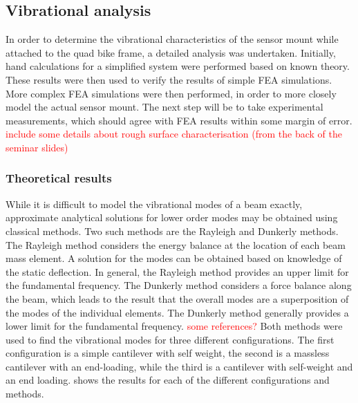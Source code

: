 \documentclass[main.tex]{subfiles}
\begin{document}
\subsection{Vibrational analysis}
In order to determine the vibrational characteristics of the sensor mount while attached to the quad bike frame, a detailed analysis was undertaken. Initially, hand calculations for a simplified system were performed based on known theory. These results were then used to verify the results of simple FEA simulations. More complex FEA simulations were then performed, in order to more closely model the actual sensor mount. The next step will be to take experimental measurements, which should agree with FEA results within some margin of error. 
 \textcolor{red}{include some details about rough surface characterisation (from the back of the seminar slides) }
\subsubsection{Theoretical results}
While it is difficult to model the vibrational modes of a beam exactly, approximate analytical solutions for lower order modes may be obtained using classical methods. Two such methods are the Rayleigh and Dunkerly methods. The Rayleigh method considers the energy balance at the location of each beam mass element. A solution for the modes can be obtained based on knowledge of the static deflection. In general, the Rayleigh method provides an upper limit for the fundamental frequency. The Dunkerly method considers a force balance along the beam, which leads to the result that the overall modes are a superposition of the modes of the individual elements. The Dunkerly method generally provides a lower limit for the fundamental frequency.
\textcolor{red}{some references?}
Both methods were used to find the vibrational modes for three different configurations. The first configuration is a simple cantilever with self weight, the second is a massless cantilever with an end-loading, while the third is a cantilever with self-weight and an end loading.   shows the results for each of the different configurations and methods.

\end{document}
